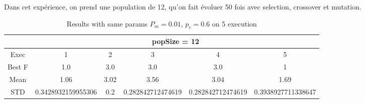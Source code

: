 Dans cet expérience, on prend une population de 12, qu'on
fait évoluer 50 fois avec selection, crossover et mutation.

\begin{table}[H]

\centering
\caption{Results with same params $ P_m = 0.01 $, $ p_c =0.6 $ on 5 execution}
\label{}
\vspace{+5mm}
\begin{adjustbox}{width=\linewidth}
\begin{tabular}{|c|c|c|c|c|c|}
\hline
       & \multicolumn{5}{c|}{popSize = 12}                                                                                                                                                                                                                                                                                                                                                                                                                      \\ \hline
Exec   & 1                                                                                     & 2                                                                                     & 3                                                                                      & 4                                                                                    & 5                                                                                      \\ \hline
Best F & 1.0                                                                                   & 3.0                                                                                   & 3.0                                                                                    & 3.0                                                                                  & 1                                                                                      \\ \hline
Mean   & 1.06                                                                                  & 3.02                                                                                  & 3.56                                                                                   & 3.04                                                                                 & 1.69                                                                                   \\ \hline
STD    & 0.3428932159955306                                                                    & 0.2                                                                                   & 0.282842712474619                                                                      & 0.282842712474619                                                                                 & 0.3938927711338647                                                                                   \\ \hline

\end{tabular}
\end{adjustbox}
\end{table}
